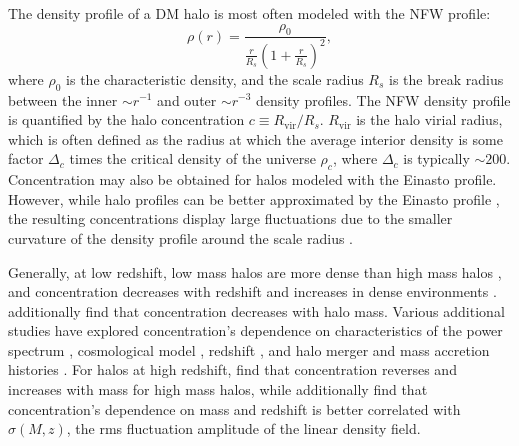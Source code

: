 The density profile of a DM halo is most often modeled with the NFW \citep{1996ApJ...462..563N} profile:
\begin{equation} \label{eq:nfw_profile}
	\rho(r) = \frac{ \rho_{0} }{ \frac{ r }{ R_{s}} \left( 1 + \frac{r}{R_{s}} \right)^{2} },
\end{equation}
where $\rho_{0}$ is the characteristic density, and the scale radius $R_{s}$ is the break radius between the inner $\sim r^{-1}$ and outer $\sim r^{-3}$ density profiles.  The NFW density profile is quantified by the halo concentration $c \equiv R_{\mathrm{vir}} / R_{s}$.  $R_{\mathrm{vir}}$ is the halo virial radius, which is often defined as the radius at which the average interior density is some factor $\Delta_{c}$ times the critical density of the universe $\rho_{c}$, where $\Delta_{c}$ is typically $\sim 200$.  Concentration may also be obtained for halos modeled with the Einasto \citep{1989A&A...223...89E} profile.  However, while halo profiles can be better approximated by the Einasto profile \citep{2004MNRAS.349.1039N, 2010MNRAS.402...21N, 2008MNRAS.387..536G}, the resulting concentrations display large fluctuations due to the smaller curvature of the density profile around the scale radius \citep{2012MNRAS.423.3018P}.

Generally, at low redshift, low mass halos are more dense than high mass halos \citep{1997ApJ...490..493N}, and concentration decreases with redshift and increases in dense environments \citep{2001MNRAS.321..559B}.  \citet{2007MNRAS.381.1450N} additionally find that concentration decreases with halo mass.  Various additional studies have explored concentration's dependence on characteristics of the power spectrum \citep{2001ApJ...554..114E}, cosmological model \citep{2008MNRAS.391.1940M}, redshift \citep{2008MNRAS.387..536G, 2011MNRAS.411..584M}, and halo merger and mass accretion histories \citep{2002ApJ...568...52W, 2003MNRAS.339...12Z, 2009ApJ...707..354Z}.  For halos at high redshift, \citet{2011ApJ...740..102K} find that concentration reverses and increases with mass for high mass halos, while \citet{2012MNRAS.423.3018P} additionally find that concentration's dependence on mass and redshift is better correlated with $\sigma(M,z)$, the rms fluctuation amplitude of the linear density field.






